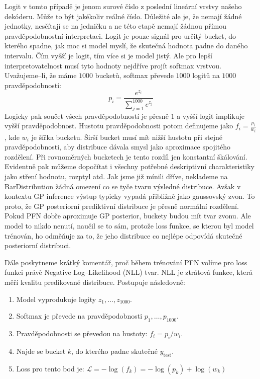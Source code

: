 Logit v tomto případě je jenom surové číslo z poslední lineární vrstvy našeho dekóderu.
Může to být jakékoliv reálné číslo.
Důležité ale je, že nemají žádné jednotky, nesčítají se na jedničku a ne této etapě nemají žádnou přímou pravděpodobnostní interpretaci.
Logit je pouze signál pro určitý bucket, do kterého spadne, jak moc si model myslí, že skutečná hodnota padne do daného intervalu.
Čím vyšší je logit, tím více si je model jistý.
Ale pro lepší interpretovatelnost musí tyto hodnoty nejdříve projít softmax vrstvou.
Uvažujeme–li, že máme $1000$ bucketů, softmax převede $1000$ logitů na $1000$ pravděpodobností:
$$p_i = \frac{e^{z_i}}{\sum_{j=1}^{1000} e^{z_j}}$$
Logicky pak součet všech pravděpodobností je přesně $1$ a vyšší logit implikuje vyšší pravděpodobnost.
Hustotu pravděpodobnosti potom definujeme jako $f_i = \frac{p_i}{w_i}$, kde $w_i$ je šířka bucketu.
Širší bucket musí mít nižší hustotu při stejné pravděpodobnosti, aby distribuce dávala smysl jako aproximace spojitého rozdělení. 
Při rovnoměrných bucketech je tento rozdíl jen konstantní škálování.
Evidentně pak můžeme dopočítat i všechny potřebné deskriptivní charakteristiky jako stření hodnotu, rozptyl atd.
Jak jsme již mínili dříve, neklademe na BarDistribution žádná omezení co se tyče tvaru výsledné distribuce.
Avšak v kontextu GP inference výstup typicky vypadá přibližně jako gaussovský zvon. 
To proto, že GP posteriorní prediktivní distribuce je přesně normální rozdělení.
Pokud PFN dobře aproximuje GP posterior, buckety budou mít tvar zvonu. 
Ale model to nikdo nenutí, naučil se to sám, protože loss funkce, se kterou byl model trénován, ho odměňuje za to, že jeho distribuce co nejlépe odpovídá skutečné posteriorní distribuci.
\par   

Dále poskytneme krátký komentář, proč během trénování PFN volíme pro loss funkci právě Negative Log–Likelihood (NLL) tvar.
NLL je ztrátová funkce, která měří kvalitu predikované distribuce. Postupuje následovně:
\begin{enumerate}
    \item Model vyprodukuje logity $z_1, \dots, z_{1000}$.
    \item Softmax je převede na pravděpodobnosti $p_1, \dots, p_{1000}$.
    \item Pravděpodobnosti se převedou na hustoty: $f_i = p_i / w_i$.
    \item Najde se bucket $k$, do kterého padne skutečné $y_{\text{test}}$.
    \item Loss pro tento bod je: $\mathcal{L} = -\log(f_k) = -\log(p_k) + \log(w_k)$
\end{enumerate}

